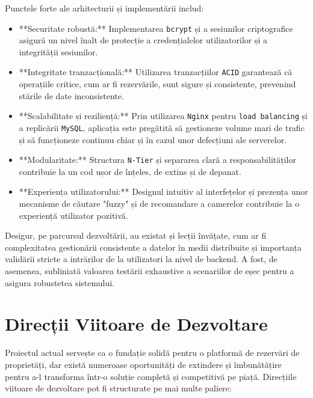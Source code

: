 \documentclass[12pt, a4paper, oneside, romanian]{teza-upb}
\begin{document}
Punctele forte ale arhitecturii și implementării includ:
\begin{itemize}
	\item **Securitate robustă:** Implementarea \texttt{bcrypt} și a sesiunilor criptografice asigură un nivel înalt de protecție a credențialelor utilizatorilor și a integrității sesiunilor.
	\item **Integritate tranzacțională:** Utilizarea tranzacțiilor \texttt{ACID} garantează că operațiile critice, cum ar fi rezervările, sunt sigure și consistente, prevenind stările de date inconsistente.
	\item **Scalabilitate și reziliență:** Prin utilizarea \texttt{Nginx} pentru \texttt{load balancing} și a replicării \texttt{MySQL}, aplicația este pregătită să gestioneze volume mari de trafic și să funcționeze continuu chiar și în cazul unor defecțiuni ale serverelor.
	\item **Modularitate:** Structura \texttt{N-Tier} și separarea clară a responsabilităților contribuie la un cod ușor de înțeles, de extins și de depanat.
	\item **Experiența utilizatorului:** Designul intuitiv al interfețelor și prezența unor mecanisme de căutare "fuzzy" și de recomandare a camerelor contribuie la o experiență utilizator pozitivă.
\end{itemize}

Desigur, pe parcursul dezvoltării, au existat și lecții învățate, cum ar fi complexitatea gestionării consistente a datelor în medii distribuite și importanța validării stricte a intrărilor de la utilizatori la nivel de backend. A fost, de asemenea, subliniată valoarea testării exhaustive a scenariilor de eșec pentru a asigura robustetea sistemului.

\section{Direcții Viitoare de Dezvoltare}
Proiectul actual servește ca o fundație solidă pentru o platformă de rezervări de proprietăți, dar există numeroase oportunități de extindere și îmbunătățire pentru a-l transforma într-o soluție completă și competitivă pe piață. Direcțiile viitoare de dezvoltare pot fi structurate pe mai multe paliere:
\end{document}
